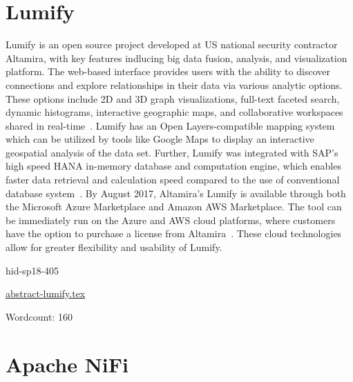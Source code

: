 \section{Lumify}

Lumify is an open source project developed at US national security
contractor Altamira, with key features indlucing big data fusion, 
analysis, and visualization platform. The web-based interface provides users 
with the ability to discover connections and explore relationships in their
data via various analytic options. These options include 2D and 3D
graph visualizations, full-text faceted search, dynamic histograms,
interactive geographic maps, and collaborative workspaces shared in
real-time~\cite{hid-sp18-405-www-lumify}. Lumify has an Open
Layers-compatible mapping system which can be utilized by tools like
Google Maps to display an interactive geospatial analysis of the data
set. Further, Lumify was integrated with SAP's high speed HANA
in-memory database and computation engine, which enables faster data
retrieval and calculation speed compared to the use of conventional
database system~\cite{hid-sp18-405-linkedinblog-lumify}. By August
2017, Altamira’s Lumify is available through both the Microsoft Azure
Marketplace and Amazon AWS Marketplace. The tool can be immediately
run on the Azure and AWS cloud platforms, where customers have the
option to purchase a license from 
Altamira~\cite{hid-sp18-405-wwwaws-lumify}\cite{hid-sp18-405-wwwazure-lumify}.
 These cloud technologies allow for greater flexibility and usability of Lumify.


\begin{IU}

hid-sp18-405

\href{https://github.com/cloudmesh-community/hid-sp18-405/blob/master//technology/abstract-lumify.tex}{abstract-lumify.tex}

 

Wordcount: 160

\end{IU}

\section{Apache NiFi}

